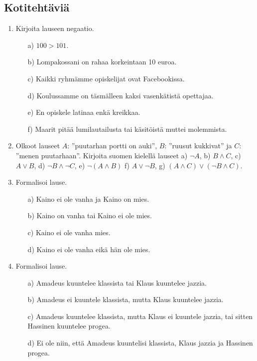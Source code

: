 \subsection*{Kotitehtäviä}

\begin{enumerate}

\item  Kirjoita lauseen negaatio.
\begin{itemize}
\item[a)] $100 > 101$.
\item[b)] Lompakossani on rahaa korkeintaan 10 euroa.
\item[c)] Kaikki ryhmämme opiskelijat ovat Facebookissa.
\item[d)] Koulussamme on täsmälleen kaksi vasenkätistä opettajaa.
\item[e)] En opiskele latinaa enkä kreikkaa.
\item[f)] Maarit pitää lumilautailusta tai käsitöistä muttei molemmista.
\end{itemize}

\item Olkoot lauseet $A$: ''puutarhan portti on auki'', $B$: ''ruusut kukkivat'' ja $C$: ''menen puutarhaan''. Kirjoita suomen kielellä lauseet a) $\lnot A$,  b)  $B\land C$,  c)  $A\lor B$,
d) $\lnot B \land \lnot C$,  e)  $\lnot(A\land B)$  f)  $A \lor \lnot B$,   g)  $(A \land C) \lor (\lnot B \land C)$. 

\item Formalisoi lause.
\begin{itemize}
\item[a)] Kaino ei ole vanha ja Kaino on mies.
\item[b)] Kaino on vanha tai Kaino ei ole mies.
\item[c)] Kaino ei ole vanha mies. 
\item[d)] Kaino ei ole vanha eikä hän ole mies.
\end{itemize}

\item Formalisoi lause.
\begin{itemize}
\item[a)] Amadeus kuuntelee klassista tai Klaus kuuntelee jazzia.
\item[b)] Amadeus ei kuuntele klassista, mutta Klaus kuuntelee jazzia.
\item[c)] Amadeus kuuntelee klassista, mutta Klaus ei kuuntele jazzia, tai sitten Hassinen kuuntelee progea.
\item[d)] Ei ole niin, että Amadeus kuuntelisi klassista, Klaus jazzia ja Hassinen progea.
\end{itemize}


\end{enumerate}
